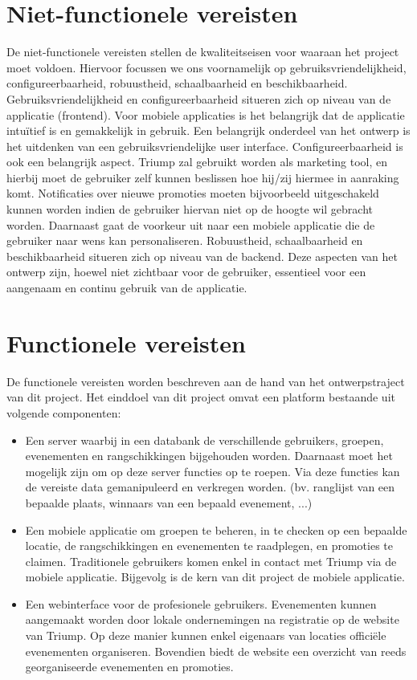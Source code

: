 \section{Niet-functionele vereisten}
De niet-functionele vereisten stellen de kwaliteitseisen voor waaraan het project moet voldoen. Hiervoor focussen we ons voornamelijk op gebruiksvriendelijkheid, configureerbaarheid, robuustheid, schaalbaarheid en beschikbaarheid.
Gebruiksvriendelijkheid en configureerbaarheid situeren zich op niveau van de applicatie (frontend). Voor mobiele applicaties is het belangrijk dat de applicatie intuïtief is en gemakkelijk in gebruik. Een belangrijk onderdeel van het ontwerp is het uitdenken van een gebruiksvriendelijke user interface. Configureerbaarheid is ook een belangrijk aspect. Triump zal gebruikt worden als marketing tool, en hierbij moet de gebruiker zelf kunnen beslissen hoe hij/zij hiermee in aanraking komt. Notificaties over nieuwe promoties moeten bijvoorbeeld uitgeschakeld kunnen worden indien de gebruiker hiervan niet op de hoogte wil gebracht worden. Daarnaast gaat de voorkeur uit naar een mobiele applicatie die de gebruiker naar wens kan personaliseren.
Robuustheid, schaalbaarheid en beschikbaarheid situeren zich op niveau van de backend. Deze aspecten van het ontwerp zijn, hoewel niet zichtbaar voor de gebruiker, essentieel voor een aangenaam en continu gebruik van de applicatie.
\section{Functionele vereisten}
De functionele vereisten worden beschreven aan de hand van het ontwerpstraject van dit project.
Het einddoel van dit project omvat een platform bestaande uit volgende componenten: 
\begin{itemize}
	
	\item Een server waarbij in een databank de verschillende gebruikers, groepen, evenementen en rangschikkingen bijgehouden worden. Daarnaast moet het mogelijk zijn om op deze server functies op te roepen. Via deze functies kan de vereiste data gemanipuleerd en verkregen worden. (bv. ranglijst van een bepaalde plaats, winnaars van een bepaald evenement, ...)
	\item Een mobiele applicatie om groepen te beheren, in te checken op een bepaalde locatie, de rangschikkingen en evenementen te raadplegen, en promoties te claimen.
	Traditionele gebruikers komen enkel in contact met Triump via de mobiele applicatie. Bijgevolg is de kern van dit project de mobiele applicatie.
	\item Een webinterface voor de profesionele gebruikers. Evenementen kunnen aangemaakt worden door lokale ondernemingen na registratie op de website van Triump. Op deze manier kunnen enkel eigenaars van locaties officiële evenementen organiseren. Bovendien biedt de website een overzicht van reeds georganiseerde evenementen en promoties.
	
\end{itemize}
